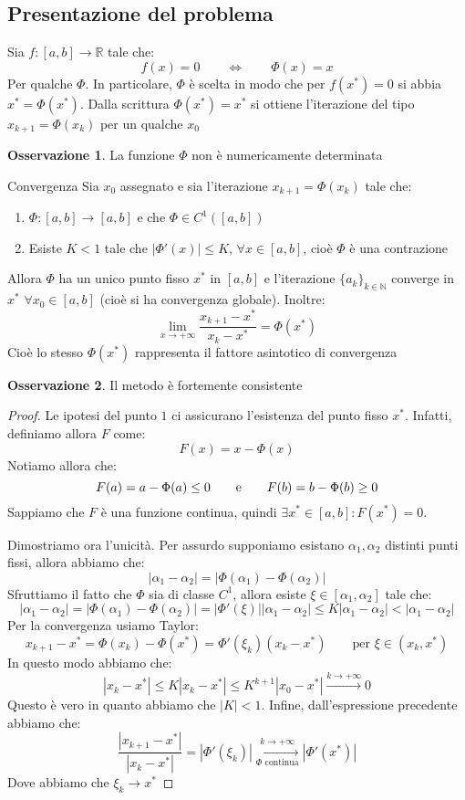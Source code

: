 \documentclass[11pt,a4paper,twoside]{article}
\theoremstyle{definition}
\newtheorem*{oss}{Osservazione}
\begin{document}
\subsection{Presentazione del problema}

Sia $f:[a,b] \to \mathbb R$ tale che:
\[ f(x) = 0 \qquad \Leftrightarrow \qquad \Phi(x) = x \]
Per qualche $\Phi$. In particolare, $\Phi$ è scelta in modo che per $f(x^*)=0$ si abbia $x^* = \Phi(x^*)$. Dalla scrittura $\Phi(x^*) = x^*$ si ottiene l'iterazione del tipo $x_{k+1} = \Phi(x_k)$ per un qualche $x_0$

\begin{oss}
	La funzione $\Phi$ non è numericamente determinata
\end{oss}

\begin{thm}{Convergenza}{}
	Sia $x_0$ assegnato e sia l'iterazione $x_{k+1} = \Phi(x_k)$ tale che:
	\begin{enumerate}
		\item $\Phi:[a,b] \to [a,b]$ e che $\Phi \in C^1 ([a,b])$
		\item Esiste $K<1$ tale che $|\Phi'(x)|\leq K$, $\forall x \in [a,b]$, cioè $\Phi$ è una contrazione
	\end{enumerate}
	Allora $\Phi$ ha un unico punto fisso $x^*$ in $[a,b]$ e l'iterazione $\{a_k\}_{k \in \mathbb N}$ converge in $x^*$ $\forall x_0 \in [a,b]$ (cioè si ha convergenza globale). Inoltre:
	\[ \lim_{x \to + \infty} \frac{x_{k+1} -x^*}{x_k - x^*} = \Phi(x^*) \]
	Cioè lo stesso $\Phi(x^*)$ rappresenta il fattore asintotico di convergenza
\end{thm}

\begin{oss}
	Il metodo è fortemente consistente
\end{oss}

\begin{proof}
	Le ipotesi del punto $1$ ci assicurano l'esistenza del punto fisso $x^*$. Infatti, definiamo allora $F$ come:
	\[ F(x) = x - \Phi(x) \]
	Notiamo allora che:
	\[ F(a) = a-\Phi(a)\leq 0 \qquad \text e \qquad F(b) = b - \Phi(b) \geq 0 \]
	Sappiamo che $F$ è una funzione continua, quindi $\exists x^* \in [a,b]: F(x^*) = 0$.

	Dimostriamo ora l'unicità. Per assurdo supponiamo esistano $\alpha_1, \alpha_2$ distinti punti fissi, allora abbiamo che:
	\[ |\alpha_1 - \alpha_2| = |\Phi(\alpha_1) - \Phi(\alpha_2)| \]
	Sfruttiamo il fatto che $\Phi$ sia di classe $C^1$, allora esiste $\xi \in [\alpha_1,\alpha_2]$ tale che:
	\[ |\alpha_1 - \alpha_2| = |\Phi(\alpha_1) - \Phi(\alpha_2)| = |\Phi'(\xi)||\alpha_1 - \alpha_2| \leq K|\alpha_1 - \alpha_2| < |\alpha_1- \alpha_2|\]
	Per la convergenza usiamo Taylor:
	\[ x_{k+1} - x^* = \Phi(x_k) - \Phi(x^*) = \Phi'(\xi_k)(x_k - x^*) \qquad \text{per }\xi\in (x_k, x^*) \]
	In questo modo abbiamo che:
	\[ |x_k - x^*| \leq K |x_k - x^*| \leq K^{k+1}|x_0 - x^*| \xrightarrow{k \to +\infty} 0 \]
	Questo è vero in quanto abbiamo che $|K|<1$. Infine, dall'espressione precedente abbiamo che:
	\[ \frac{|x_{k+1} - x^*|}{|x_k - x^*|} = |\Phi'(\xi_k)| \xrightarrow[\Phi \text{ continua}]{k \to +\infty} |\Phi'(x^*)| \]
	Dove abbiamo che $\xi_k\to x^*$
\end{proof}
\end{document}
